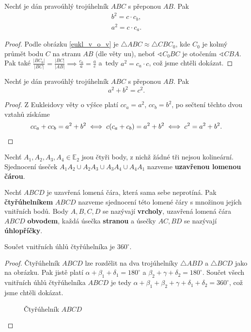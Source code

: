 \begin{veta}
  Nechť je dán pravoúhlý trojúhelník $ABC$ s přeponou $AB$. Pak
  \begin{align*}
    b^2 = c \cdot c_b,\\
    a^2 = c \cdot c_a.
  \end{align*}
\end{veta}

\begin{proof}
  Podle obrázku \ref{eukl_v_o_v} je
  $\triangle ABC \approx \triangle CBC_0$, kde $C_0$ je kolmý průmět bodu $C$ na stranu $AB$ (dle věty uu), neboť $\sphericalangle C_0 BC$ je otočením $\sphericalangle CBA$. Pak také $\frac{|BC_0|}{|BC|} = \frac{|BC|}{|AB|} \implies \frac{c_a}{a} = \frac{a}{c}$ a~tedy $a^2 = c_a \cdot c$, což jsme chtěli dokázat.
\end{proof}

\begin{veta}[Pythagorova]
  Nechť je dán pravoúhlý trojúhelník $ABC$ s přeponou $AB$. Pak
  \[
    a^2+b^2 = c^2.
  \]
\end{veta}


\begin{proof}
  Z Eukleidovy věty o výšce platí $cc_a=a^2$, $cc_b=b^2$, po sečtení těchto dvou vztahů získáme
  \[
    cc_a+cc_b=a^2+b^2 \iff c(c_a+c_b)=a^2+b^2 \iff c^2=a^2+b^2. \qedhere
  \]
\end{proof}

\begin{definition}
  Nechť $A_1,A_2, A_3, A_4 \in \mathbb E_2$ jsou čtyři body, z nichž žádné tři nejsou kolineární. Sjednocení úseček $A_1A_2\cup A_2A_3 \cup A_3A_4 \cup A_4A_1$ nazveme \textbf{uzavřenou lomenou čárou}.
\end{definition}

\begin{definition}
  Nechť $ABCD$ je uzavřená lomená čára, která sama sebe neprotíná. Pak \textbf{čtyřúhelníkem} $ABCD$ nazveme sjednocení této lomené čáry s množinou jejích vnitřních bodů. Body $A,B,C,D$ se nazývají \textbf{vrcholy}, uzavřená lomená čára $ABCD$ \textbf{obvodem}, každá úsečka \textbf{stranou} a úsečky $AC,BD$ se nazývají \textbf{úhlopříčky}.
\end{definition}

\begin{veta}
  Součet vnitřních úhlů čtyřúhelníka je $360^\circ$.
\end{veta}

\begin{proof}
  Čtyřúhelník $ABCD$ lze rozdělit na dva trojúhelníky
  $\triangle ABD $ a $\triangle BCD$ jako na obrázku.
  Pak jistě platí $\alpha + \beta_1 + \delta_1 = 180^\circ$ a
  $\beta_2 + \gamma + \delta_2 = 180^\circ$. Součet všech vnitřních úhlů
  čtyřúhelníka $ABCD$ je tedy $\alpha + \beta_1 + \beta_2 + \gamma + \delta_1
  + \delta_2 = 360^\circ$, což jsme chtěli dokázat.
  \begin{figure}[ht!]
    \centering
    \caption{Čtyřúhelník $ABCD$}
  \end{figure}
\end{proof}

